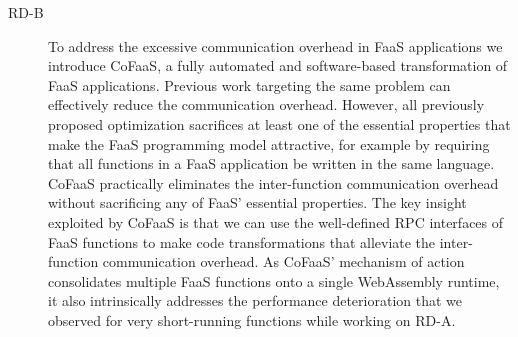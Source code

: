 \documentclass[../main.tex]{subfiles}
\begin{document}
\begin{refsection}
\begin{description}
\item[RD-B] To address the excessive communication overhead in FaaS
  applications we introduce CoFaaS, a fully automated and
  software-based transformation of FaaS applications. Previous work
  targeting the same problem can effectively reduce the communication
  overhead. However, all previously proposed optimization sacrifices
  at least one of the essential properties that make the FaaS
  programming model attractive, for example by requiring that all
  functions in a FaaS application be written in the same
  language. CoFaaS practically eliminates the inter-function
  communication overhead without sacrificing any of FaaS' essential
  properties. The key insight exploited by CoFaaS is that we can use
  the well-defined RPC interfaces of FaaS functions to make code
  transformations that alleviate the inter-function communication
  overhead. As CoFaaS' mechanism of action consolidates multiple FaaS
  functions onto a single WebAssembly runtime, it also intrinsically
  addresses the performance deterioration that we observed for very
  short-running functions while working on RD-A.

\end{description}




 


\ifx\chapincluded\undefined
  \printbibliography
  \end{refsection}
 \fi
\end{document}
